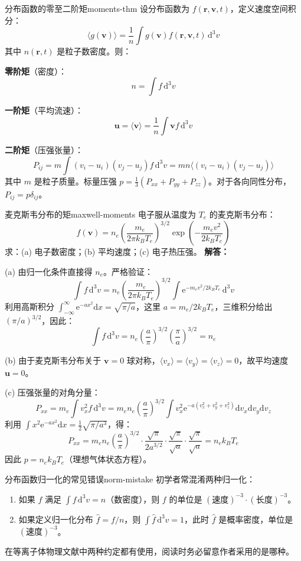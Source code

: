 \documentclass[12pt,a4paper,openany,oneside]{book}
\newcommand{\diff}{\mathrm{d}}
\newcommand{\ee}{\mathrm{e}}
\newcommand{\vect}[1]{\bm{#1}}
\newcommand{\difficulty}[1]{\marginnote{\hfill\textcolor{coverMid!80}{\rule[-0.1em]{2pt}{0.9em}}\,\textcolor{coverMid}{\footnotesize\textbf{[#1]}}}}
\begin{document}
\begin{theorem}{分布函数的零至二阶矩}{moments-thm}
设分布函数为 $f(\vect{r},\vect{v},t)$，定义速度空间积分：
\[
\langle g(\vect{v}) \rangle = \frac{1}{n}\int g(\vect{v}) f(\vect{r},\vect{v},t)\,\diff^3v
\]
其中 $n(\vect{r},t)$ 是粒子数密度。则：

\textbf{零阶矩}（密度）：
\[
n = \int f\,\diff^3v
\]

\textbf{一阶矩}（平均流速）：
\[
\vect{u} = \langle \vect{v} \rangle = \frac{1}{n}\int \vect{v} f\,\diff^3v
\]

\textbf{二阶矩}（压强张量）：
\[
P_{ij} = m \int (v_i - u_i)(v_j - u_j) f\,\diff^3v = mn \langle (v_i-u_i)(v_j-u_j) \rangle
\]
其中 $m$ 是粒子质量。标量压强 $p = \frac{1}{3}(P_{xx}+P_{yy}+P_{zz})$。对于各向同性分布，$P_{ij} = p\delta_{ij}$。
\end{theorem}

\begin{example}{麦克斯韦分布的矩}{maxwell-moments}
\difficulty{基础}
电子服从温度为 $T_e$ 的麦克斯韦分布：
\[
f(\vect{v}) = n_e \left(\frac{m_e}{2\pi k_B T_e}\right)^{3/2} \exp\left(-\frac{m_e v^2}{2k_B T_e}\right)
\]
求：(a) 电子数密度；(b) 平均速度；(c) 电子热压强。
\tcblower
\textbf{解答：}

(a) 由归一化条件直接得 $n_e$。严格验证：
\[
\int f\,\diff^3v = n_e \left(\frac{m_e}{2\pi k_B T_e}\right)^{3/2} \int \ee^{-m_e v^2/2k_B T_e}\,\diff^3v
\]
利用高斯积分 $\int_{-\infty}^{\infty} \ee^{-ax^2}\diff x = \sqrt{\pi/a}$，这里 $a = m_e/2k_B T_e$，三维积分给出 $(\pi/a)^{3/2}$，因此：
\[
\int f\,\diff^3v = n_e \left(\frac{a}{\pi}\right)^{3/2} \left(\frac{\pi}{a}\right)^{3/2} = n_e
\]

(b) 由于麦克斯韦分布关于 $\vect{v}=0$ 球对称，$\langle v_x \rangle = \langle v_y \rangle = \langle v_z \rangle = 0$，故平均速度 $\vect{u}=0$。

(c) 压强张量的对角分量：
\[
P_{xx} = m_e \int v_x^2 f\,\diff^3v = m_e n_e \left(\frac{a}{\pi}\right)^{3/2} \int v_x^2 \ee^{-a(v_x^2+v_y^2+v_z^2)}\diff v_x\diff v_y\diff v_z
\]
利用 $\int x^2 \ee^{-ax^2}\diff x = \frac{1}{2}\sqrt{\pi/a^3}$，得：
\[
P_{xx} = m_e n_e \left(\frac{a}{\pi}\right)^{3/2} \cdot \frac{\sqrt{\pi}}{2a^{3/2}} \cdot \frac{\sqrt{\pi}}{\sqrt{a}} \cdot \frac{\sqrt{\pi}}{\sqrt{a}} = n_e k_B T_e
\]
因此 $p = n_e k_B T_e$（理想气体状态方程）。
\end{example}

\begin{warning}{分布函数归一化的常见错误}{norm-mistake}
初学者常混淆两种归一化：
\begin{enumerate}
\item 如果 $f$ 满足 $\int f\,\diff^3v = n$（数密度），则 $f$ 的单位是 $(\text{速度})^{-3}\cdot(\text{长度})^{-3}$。
\item 如果定义归一化分布 $\hat{f} = f/n$，则 $\int \hat{f}\,\diff^3v = 1$，此时 $\hat{f}$ 是概率密度，单位是 $(\text{速度})^{-3}$。
\end{enumerate}
在等离子体物理文献中两种约定都有使用，阅读时务必留意作者采用的是哪种。
\end{warning}
\end{document}
